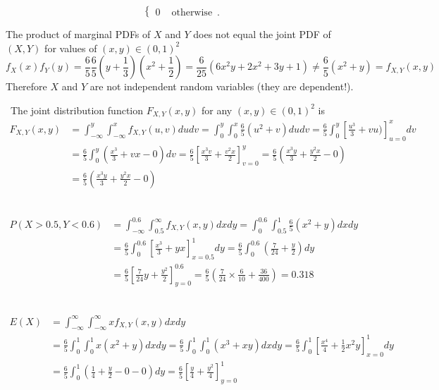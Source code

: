 \begin{ExerciseList}
\[\begin{cases}
0 & \text{ otherwise} \enspace .
\end{cases}
\]
\item The product of marginal PDFs of $X$ and $Y$ does not equal the joint PDF of $(X,Y)$ for values of $(x,y) \in (0,1)^2$
\[
f_X(x)f_Y(y) = \frac{6}{5} \frac{6}{5} \left( y + \frac{1}{3} \right) \left( x^2 + \frac{1}{2} \right) = \frac{6}{25} \left( 6 x^2y+2x^2+3y+1\right) \neq \frac{6}{5}(x^2+y) = f_{X,Y}(x,y)
\]
Therefore $X$ and $Y$ are not independent random variables (they are dependent!).
\item~The joint distribution function $F_{X,Y}(x,y)$ for any $(x,y) \in (0,1)^2$ is
\begin{align*}
F_{X,Y}(x,y) 
&= \int_{-\infty}^{y} \int_{-\infty}^{x} f_{X,Y}(u,v) du dv
= \int_{0}^{y} \int_{0}^{x} \frac{6}{5} (u^2+v) du dv
= \frac{6}{5} \int_{0}^{y} \left[ \frac{u^3}{3}+vu) \right]_{u=0}^{x} dv\\
&= \frac{6}{5} \int_{0}^{y} \left( \frac{x^3}{3}+vx - 0 \right) dv
= \frac{6}{5} \left[ \frac{x^3v}{3}+\frac{v^2x}{2} \right]_{v=0}^{y}
= \frac{6}{5} \left( \frac{x^3y}{3}+\frac{y^2x}{2} - 0 \right)\\
&= \frac{6}{5} \left( \frac{x^3y}{3}+\frac{y^2x}{2} - 0 \right)
\end{align*}
\item~
\begin{align*}
P(X>0.5,Y<0.6) 
&= \int_{-\infty}^{0.6} \int_{0.5}^{\infty} f_{X,Y}(x,y) dx dy
= \int_{0}^{0.6} \int_{0.5}^{1} \frac{6}{5} (x^2+y) dx dy\\
&= \frac{6}{5} \int_{0}^{0.6} \left[ \frac{x^3}{3}+yx \right]_{x=0.5}^{1} dy
= \frac{6}{5} \int_{0}^{0.6} \left(\frac{7}{24} + \frac{y}{2} \right) dy\\
&= \frac{6}{5} \left[\frac{7}{24}y + \frac{y^2}{2} \right]_{y=0}^{0.6}
= \frac{6}{5} \left(\frac{7}{24}\times \frac{6}{10} + \frac{36}{400} \right)
=0.318
\end{align*}
\item~
\begin{align*}
E(X) 
&= \int_{-\infty}^{\infty} \int_{-\infty}^{\infty} x f_{X,Y}(x,y) dx dy\\
&=\frac{6}{5} \int_{0}^{1} \int_{0}^{1}  x \left( x^2 + y \right) dx dy
=\frac{6}{5} \int_{0}^{1} \int_{0}^{1}  \left( x^3 + xy \right) dx dy
= \frac{6}{5} \int_{0}^{1} \left[ \frac{x^4}{4} + \frac{1}{2}x^2y\right]_{x=0}^{1} dy\\
&=\frac{6}{5} \int_{0}^{1} \left( \frac{1}{4} + \frac{y}{2} - 0 - 0\right) dy
= \frac{6}{5} \left[ \frac{y}{4} + \frac{y^2}{4} \right]_{y=0}^{1} 

\end{align*}
\end{ExerciseList}
